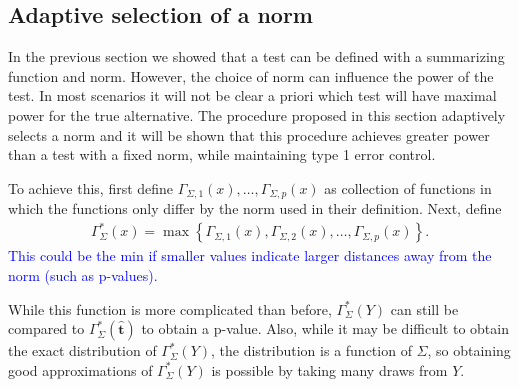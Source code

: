 \documentclass{article}
\newcommand{\vmat}{\Sigma}
\newcommand{\norm}{f}
\newcommand{\tst}{\hat{\boldsymbol{t}}}
\newcommand{\rvt}{Y}
\newcommand{\Gammaf}{\Gamma_{\Sigma}}
\begin{document}

\subsection{Adaptive selection of a norm}
In the previous section we showed that a test can be defined with a summarizing function and norm. However, the choice of norm can influence the power of the test. In most scenarios it will not be clear a priori which test will have maximal power for the true alternative. The procedure proposed in this section adaptively selects a norm and it will be shown that this procedure achieves greater power than a test with a fixed norm, while maintaining type 1 error control.  

To achieve this, first define $\Gamma_{\Sigma, 1}(x), \dots, \Gamma_{\Sigma, p}(x)$ as collection of functions in which the functions only differ by the norm used in their definition. Next, define
\begin{align*}
	\Gammaf^*(x) = \max\left\{\Gamma_{\Sigma, 1}(x), \Gamma_{\Sigma, 2}(x), \dots, \Gamma_{\Sigma, p}(x)\right\}.
\end{align*}
\textcolor{blue}{This could be the min if smaller values indicate larger distances away from the norm (such as p-values).}  

While this function is more complicated than before,  $\Gammaf^*(\rvt)$ can still be compared to $\Gammaf^*(\tst)$ to obtain a p-value. Also, while it may be difficult to obtain the exact distribution of $\Gammaf^*(\rvt)$, the distribution is a function of $\vmat$, so obtaining good approximations of $\Gammaf^*(\rvt)$ is possible by taking many draws from $\rvt$.
\end{document}
